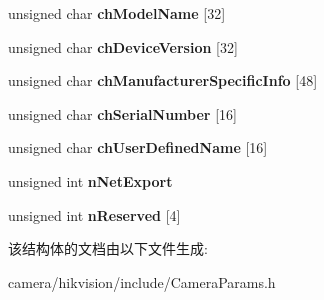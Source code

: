 \begin{DoxyCompactItemize}
unsigned char {\bfseries ch\+Model\+Name} \mbox{[}32\mbox{]}
\item 
\mbox{\label{struct___m_v___g_i_g_e___d_e_v_i_c_e___i_n_f_o___a02557eaae3ff3817896ece02cd2221e1}} 
unsigned char {\bfseries ch\+Device\+Version} \mbox{[}32\mbox{]}
\item 
\mbox{\label{struct___m_v___g_i_g_e___d_e_v_i_c_e___i_n_f_o___a4a210f7bc01f42b0a5e92c5b95c821d1}} 
unsigned char {\bfseries ch\+Manufacturer\+Specific\+Info} \mbox{[}48\mbox{]}
\item 
\mbox{\label{struct___m_v___g_i_g_e___d_e_v_i_c_e___i_n_f_o___afb7b3f216a8beecd7e52eac91605a03e}} 
unsigned char {\bfseries ch\+Serial\+Number} \mbox{[}16\mbox{]}
\item 
\mbox{\label{struct___m_v___g_i_g_e___d_e_v_i_c_e___i_n_f_o___a7d685cd94118e586748bf841215b2af8}} 
unsigned char {\bfseries ch\+User\+Defined\+Name} \mbox{[}16\mbox{]}
\item 
\mbox{\label{struct___m_v___g_i_g_e___d_e_v_i_c_e___i_n_f_o___a4aa6d30162d467f795d83abaa85bce5e}} 
unsigned int {\bfseries n\+Net\+Export}
\item 
\mbox{\label{struct___m_v___g_i_g_e___d_e_v_i_c_e___i_n_f_o___ab6bd09927a7d373ca8cf6870defde947}} 
unsigned int {\bfseries n\+Reserved} \mbox{[}4\mbox{]}
\end{DoxyCompactItemize}


该结构体的文档由以下文件生成\+:\begin{DoxyCompactItemize}
\item 
camera/hikvision/include/Camera\+Params.\+h\end{DoxyCompactItemize}

